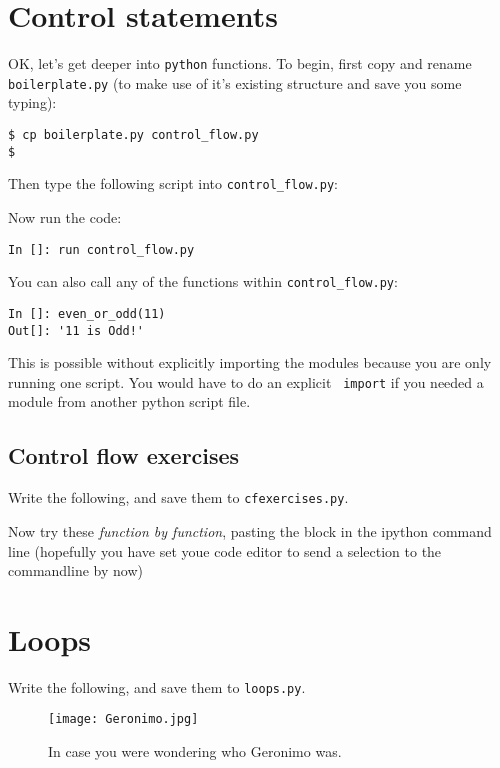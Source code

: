 \section{Control statements}

OK, let's get deeper into {\tt python} functions. To begin, first copy 
and rename {\tt boilerplate.py} (to make use of it's existing 
structure and save you some typing):
\begin{lstlisting}  
$ cp boilerplate.py control_flow.py
$
\end{lstlisting}
Then type the following script into {\tt control\_flow.py}:


Now run the code:
\begin{lstlisting}
In []: run control_flow.py
\end{lstlisting}

You can also call any of the functions within {\tt control\_flow.py}:
\begin{lstlisting}
In []: even_or_odd(11)
Out[]: '11 is Odd!'
\end{lstlisting}
This is possible without explicitly importing the modules because you 
are only running one script. You would have to do an explicit {\tt 
import} if you needed a module from another python script file.

\subsection{Control flow exercises}

\begin{compactitem} [$\quad\star$]\itemsep4pt
	\item Write the following, and save them to {\tt cfexercises.py}.
	\item Now try these {\it function by function}, pasting the block in 
	the ipython command line (hopefully you have set youe code editor to 
	send a selection to the commandline by now) 

\end{compactitem}



\section{Loops}

Write the following, and save them to {\tt loops.py}.

\begin{figure}
	\begin{center}
    \texttt{[image: Geronimo.jpg]}
\end{center}
\caption{In case you were wondering who Geronimo was.}
\end{figure}


